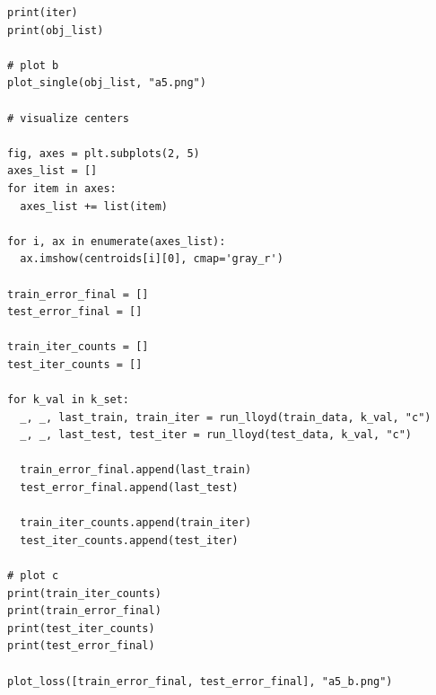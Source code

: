 \documentclass{article}
\newcommand{\1}{\mathbf{1}}
\begin{document}
{\begin{verbatim}
print(iter)
print(obj_list)

# plot b
plot_single(obj_list, "a5.png")

# visualize centers

fig, axes = plt.subplots(2, 5)
axes_list = []
for item in axes:
  axes_list += list(item)

for i, ax in enumerate(axes_list):
  ax.imshow(centroids[i][0], cmap='gray_r')

train_error_final = []
test_error_final = []

train_iter_counts = []
test_iter_counts = []

for k_val in k_set:
  _, _, last_train, train_iter = run_lloyd(train_data, k_val, "c")
  _, _, last_test, test_iter = run_lloyd(test_data, k_val, "c")

  train_error_final.append(last_train)
  test_error_final.append(last_test)

  train_iter_counts.append(train_iter)
  test_iter_counts.append(test_iter)

# plot c
print(train_iter_counts)
print(train_error_final)
print(test_iter_counts)
print(test_error_final)

plot_loss([train_error_final, test_error_final], "a5_b.png")
\end{verbatim}

\newpage

}
\end{document}
